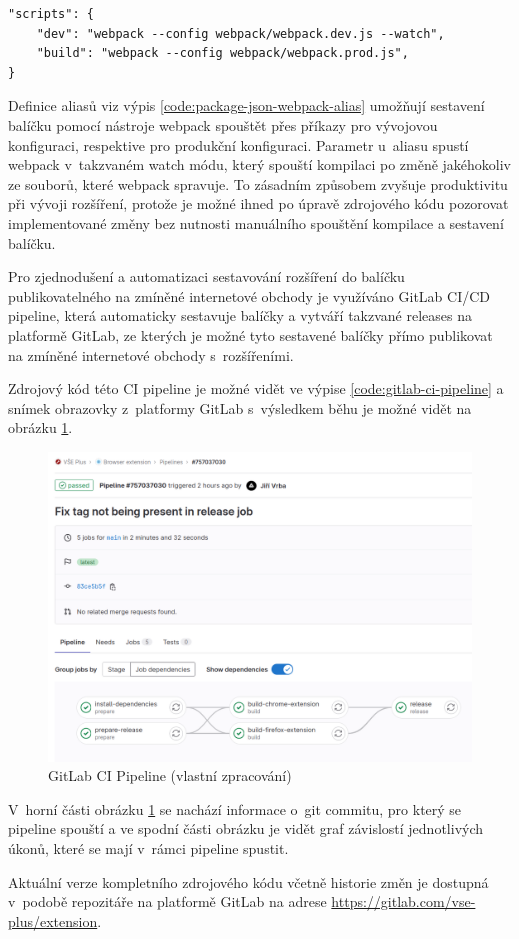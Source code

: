 \begin{lstlisting}[label={code:package-json-webpack-alias}, caption={Definice aliasů pro práci s~nástrojem webpack (vlastní zpracování)}]
"scripts": {
    "dev": "webpack --config webpack/webpack.dev.js --watch",
    "build": "webpack --config webpack/webpack.prod.js",
}
\end{lstlisting}

Definice aliasů viz výpis \ref{code:package-json-webpack-alias} umožňují sestavení balíčku pomocí nástroje webpack spouštět přes příkazy  pro vývojovou konfiguraci, respektive  pro produkční konfiguraci. Parametr  u~aliasu  spustí webpack v~takzvaném watch módu, který spouští kompilaci po změně jakéhokoliv ze souborů, které webpack spravuje. To zásadním způsobem zvyšuje produktivitu při vývoji rozšíření, protože je možné ihned po úpravě zdrojového kódu pozorovat implementované změny bez nutnosti manuálního spouštění kompilace a sestavení balíčku.

Pro zjednodušení a automatizaci sestavování rozšíření do balíčku publikovatelného na zmíněné internetové obchody je využíváno GitLab CI/CD pipeline, která automaticky sestavuje balíčky a vytváří takzvané releases na platformě GitLab, ze kterých je možné tyto sestavené balíčky přímo publikovat na zmíněné internetové obchody s~rozšířeními. 

Zdrojový kód této CI pipeline je možné vidět ve výpise \ref{code:gitlab-ci-pipeline} a snímek obrazovky z~platformy GitLab s~výsledkem běhu je možné vidět na obrázku \ref{fig:extension-gitlab-ci}. 

\begin{figure}[htbp!]\centering
    \includegraphics[width=\textwidth]{img/extension-gitlab-ci-pipeline-overview.png}
    \caption{GitLab CI Pipeline (vlastní zpracování)}
    \label{fig:extension-gitlab-ci}
\end{figure}

V~horní části obrázku \ref{fig:extension-gitlab-ci} se nachází informace o~git commitu, pro který se pipeline spouští a ve spodní části obrázku je vidět graf závislostí jednotlivých úkonů, které se mají v~rámci pipeline spustit.

Aktuální verze kompletního zdrojového kódu včetně historie změn je dostupná v~podobě repozitáře na platformě GitLab na adrese \url{https://gitlab.com/vse-plus/extension}.
